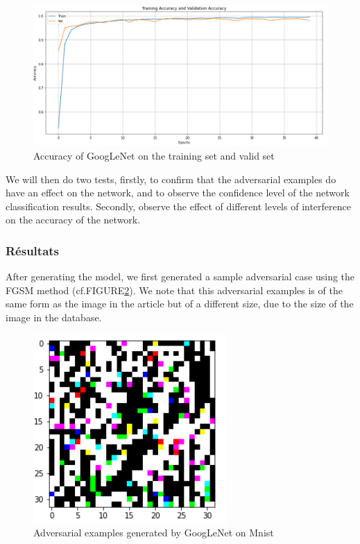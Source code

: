 \FloatBarrier
\begin{figure}[htbp]%
        \centering
        \includegraphics[scale=0.3]{GLNtrainingAcc.PNG}%
        \caption{ Accuracy of GoogLeNet on the training set and valid set}
        \label{GLN}
\end{figure}\par
\FloatBarrier

We will then do two tests, firstly, to confirm that the adversarial examples do have an effect on the network, and to observe the confidence level of the network classification results. Secondly, observe the effect of different levels of interference on the accuracy of the network.
\subsubsection{Résultats}
After generating the model, we first generated a sample adversarial case using the FGSM method (cf.FIGURE\ref{adv_exp}). We note that this adversarial examples is of the same form as the image in the article but of a different size, due to the size of the image in the database.
\FloatBarrier
\begin{figure}[htbp]
        \centering
        \includegraphics[scale=0.25]{adv_exp.PNG}%
        \caption{Adversarial examples generated by GoogLeNet on Mnist}
        \label{adv_exp}
\end{figure}\par
\FloatBarrier

